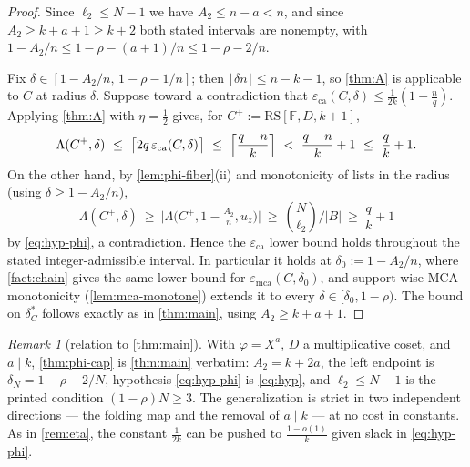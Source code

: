 \documentclass[11pt]{article}
\theoremstyle{definition}
\theoremstyle{remark}
\newtheorem{remark}[theorem]{Remark}
\newcommand{\F}{\mathbb{F}}
\newcommand{\B}{B}
\newcommand{\RS}{\mathrm{RS}}
\newcommand{\eca}{\varepsilon_{\mathrm{ca}}}
\newcommand{\emca}{\varepsilon_{\mathrm{mca}}}
\newcommand{\Lst}{\Lambda}
\begin{document}
\begin{proof}
Since $\ell_2\le N-1$ we have $A_2\le n-a<n$, and since $A_2\ge k+a+1\ge k+2$ both stated intervals are nonempty, with $1-A_2/n\le1-\rho-(a+1)/n\le1-\rho-2/n$.

Fix $\delta\in[1-A_2/n,\,1-\rho-1/n]$; then $\lfloor\delta n\rfloor\le n-k-1$, so \cref{thm:A} is applicable to $C$ at radius $\delta$. Suppose toward a contradiction that $\eca(C,\delta)\le\frac1{2k}(1-\frac nq)$. Applying \cref{thm:A} with $\eta=\frac12$ gives, for $C^+:=\RS[\F,D,k+1]$,
\[
\Lst(C^+,\delta)\ \le\ \bigl\lceil2q\,\eca(C,\delta)\bigr\rceil
\ \le\ \Bigl\lceil\frac{q-n}k\Bigr\rceil
\ <\ \frac{q-n}k+1\ \le\ \frac qk+1 .
\]
On the other hand, by \cref{lem:phi-fiber}(ii) and monotonicity of lists in the radius (using $\delta\ge1-A_2/n$),
\[
\Lst(C^+,\delta)\ \ge\ \bigl|\Lst\bigl(C^+,1-\tfrac{A_2}n,u_z\bigr)\bigr|\ \ge\ \binom N{\ell_2}\Big/|\B|\ \ge\ \frac qk+1
\]
by \eqref{eq:hyp-phi}, a contradiction. Hence the $\eca$ lower bound holds throughout the stated integer-admissible interval. In particular it holds at $\delta_0:=1-A_2/n$, where \cref{fact:chain} gives the same lower bound for $\emca(C,\delta_0)$, and support-wise MCA monotonicity (\cref{lem:mca-monotone}) extends it to every $\delta\in[\delta_0,1-\rho)$. The bound on $\delta^*_C$ follows exactly as in \cref{thm:main}, using $A_2\ge k+a+1$.
\end{proof}

\begin{remark}[relation to \cref{thm:main}]\label{rem:phi-cap-scope}
With $\varphi=X^a$, $D$ a multiplicative coset, and $a\mid k$, \cref{thm:phi-cap} is \cref{thm:main} verbatim: $A_2=k+2a$, the left endpoint is $\delta_N=1-\rho-2/N$, hypothesis \eqref{eq:hyp-phi} is \eqref{eq:hyp}, and $\ell_2\le N-1$ is the printed condition $(1-\rho)N\ge3$. The generalization is strict in two independent directions --- the folding map and the removal of $a\mid k$ --- at no cost in constants. As in \cref{rem:eta}, the constant $\frac1{2k}$ can be pushed to $\frac{1-o(1)}k$ given slack in \eqref{eq:hyp-phi}.
\end{remark}
\end{document}
